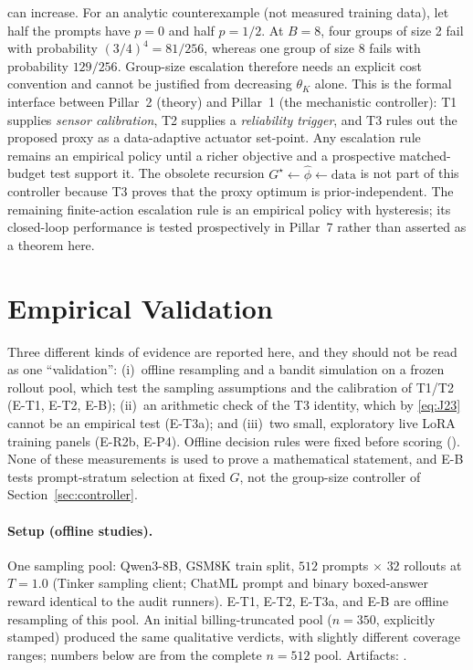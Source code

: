 \documentclass[11pt]{article}
\theoremstyle{plain}
\theoremstyle{definition}
\theoremstyle{remark}
\newcommand{\1}{\mathbb{1}}
\begin{document}
can increase. For an analytic counterexample (not measured training data),
let half the prompts have $p=0$ and half $p=1/2$. At $B=8$, four groups of
size 2 fail with probability $(3/4)^4=81/256$, whereas one group of size 8
fails with probability $129/256$. Group-size escalation therefore needs an
explicit cost convention and cannot be justified from decreasing $\theta_K$
alone.
This is the formal interface between Pillar~2 (theory) and Pillar~1 (the
mechanistic controller): T1 supplies \emph{sensor calibration}, T2 supplies a
\emph{reliability trigger}, and T3 rules out the proposed proxy as a
data-adaptive actuator set-point. Any escalation rule remains an empirical
policy until a richer objective and a prospective matched-budget test support it.
The obsolete recursion $G^\star\leftarrow\widehat\phi\leftarrow\mathrm{data}$
is not part of this controller because T3 proves that the proxy optimum is
prior-independent. The remaining finite-action escalation rule is an empirical
policy with hysteresis; its closed-loop performance is tested prospectively in
Pillar~7 rather than asserted as a theorem here.

\section{Empirical Validation}\label{sec:empirical}
Three different kinds of evidence are reported here, and they should not be
read as one ``validation'': (i)~offline resampling and a bandit simulation on a
frozen rollout pool, which test the sampling assumptions and the calibration of
T1/T2 (E-T1, E-T2, E-B); (ii)~an arithmetic check of the T3 identity, which by
\eqref{eq:J23} cannot be an empirical test (E-T3a); and (iii)~two small,
exploratory live LoRA training panels (E-R2b, E-P4). Offline decision rules were
fixed before scoring (). None of
these measurements is used to prove a mathematical statement, and E-B tests
prompt-stratum selection at fixed $G$, not the group-size controller of
Section~\ref{sec:controller}.

\paragraph{Setup (offline studies).} One sampling pool: Qwen3-8B, GSM8K train
split, $512$ prompts $\times$ $32$ rollouts at $T{=}1.0$ (Tinker sampling
client; ChatML prompt and binary boxed-answer reward identical to the audit
runners). E-T1, E-T2, E-T3a, and E-B are offline resampling of this pool. An
initial billing-truncated pool ($n{=}350$, explicitly stamped) produced the
same qualitative verdicts, with slightly different coverage ranges; numbers
below are from the complete $n{=}512$ pool. Artifacts:
.
\end{document}
